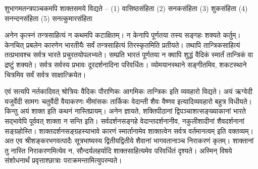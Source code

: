 शुभागमतन्त्रपञ्चकमपि शाक्तसमये विद्यते – (1) वासिष्ठसंहिता (2) सनकसंहिता (3) शुकसंहिता (4) सनन्दनसंहिता (5) सनत्कुमारसंहिता

अनेन कृत्स्नं तन्त्रसाहित्यं न कथमपि कटाक्षितम्। न केनापि पूर्णतया तस्य सङ्गहः शक्यते कर्तुम्। केनचित् प्रबलेन कारणेन भारतीयैः सर्वं तन्त्रसाहित्यं तिरस्कृतमिति प्रतीयते। तथापि तान्त्रिकसाहित्यं तत्प्रभावश्च सर्वत्र भारते प्रचुरतयोपलभ्यते। सम्प्रति भारतं पूर्णतया न क्वापि शुद्धं वैदिकं स्मार्तं तान्त्रिकं वा द्रष्टुं शक्यते। सर्वत्र सर्वस्य प्रभावः दूरदर्शनादिना परिवर्धितः। व्योमयानस्थाने सङ्गीतमिव, शकटस्थाने चित्रमिव सर्वं सर्वत्र साक्षात्क्रियेत।

एवं सत्यपि नर्तकादिवत् श्रोत्रियः वैदिकः पौराणिकः आगमिकः तान्त्रिकः इति व्यवहारो विद्यते। अयं ऋग्वेदी यजुर्वेदी सामगः चतुर्वेदी वैयाकरणः मीमांसकः तार्किकः वेदान्ती शैवः वैष्णव इत्यादिव्यवहारो बहुत्र विधीयते। किन्तु अयं शाक्त इति कथनं नास्तिप्रायम्। अनेन ज्ञायते, शक्तिपीठानां द्विपञ्चाशत्सङ्ख्याकानां भारते सद्भावेपि पूर्ववत् शाक्ता न सन्ति इति। सर्वदर्शनसङ्गहे वेदान्तदर्शनानीव, नकुलीशादीनां शैवदर्शनानां सङ्ग्रहोस्ति। शाक्तदर्शनसङ्ग्रहस्याभावे कारणं स्मार्तानामेव शाक्तत्वेन सर्वत्र वर्तमानत्वम् इति वक्तव्यम्। अत एव श्रीशङ्करभगवत्पादैः सूत्रभाष्यस्य द्वितीयद्वितीये शैवानां भागवतानाञ्च निराकरणं कृतम्। शाक्तानां तु नास्ति निराकरणमित्येव न, सौन्दर्यलहर्यादि शाक्तसाहित्यमेव परिवर्धितं दृश्यते। अस्मिन् विषये  संशोधनार्थं प्रवृत्ताश्छात्राः पराक्रमन्तामित्युपरम्यते।

\articleend
